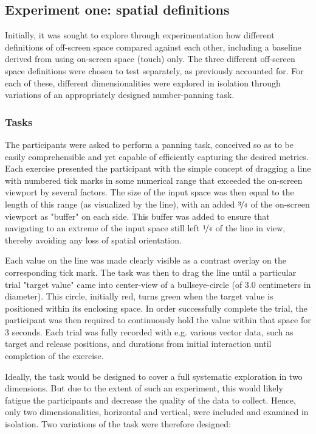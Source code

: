 \subsection{Experiment one: spatial definitions}

Initially, it was sought to explore through experimentation how different definitions of off-screen space  compared against each other, including a baseline derived from using on-screen space (touch) only. The three different off-screen space definitions were chosen to test separately, as previously accounted for. For each of these, different dimensionalities were explored in isolation through variations of an appropriately designed number-panning task. 

\subsubsection{Tasks}

The participants were asked to perform a panning task, conceived so as to be easily comprehensible and yet capable of efficiently capturing the desired metrics. Each exercise presented the participant with the simple concept of dragging a line with numbered tick marks in some numerical range that exceeded the on-screen viewport by several factors. The size of the input space was then equal to the length of this range (as visualized by the line), with an added $\nicefrac{3}{4}$ of the on-screen viewport as "buffer" on each side. This buffer was added to ensure that navigating to an extreme of the input space still left $\nicefrac{1}{4}$ of the line in view, thereby avoiding any loss of spatial orientation. 

Each value on the line was made clearly visible as a contrast overlay on the corresponding tick mark. The  task was then to drag the line until a particular trial "target value" came into center-view  of a bullseye-circle (of 3.0 centimeters in diameter). This circle, initially red, turns green when the target value is positioned within its enclosing space. In order successfully complete the trial, the participant was then required to continuously hold the value within that space for 3 seconds. Each trial was fully recorded with e.g. various vector data, such as target and release positions, and durations from initial interaction until completion of the exercise.

Ideally, the task would be designed to cover a full systematic exploration in two dimensions. But due to the extent of such an experiment, this would likely fatigue the participants and decrease the quality of the data to collect. Hence, only two dimensionalities, horizontal and vertical, were included and examined in isolation. Two variations of the task were therefore designed:

